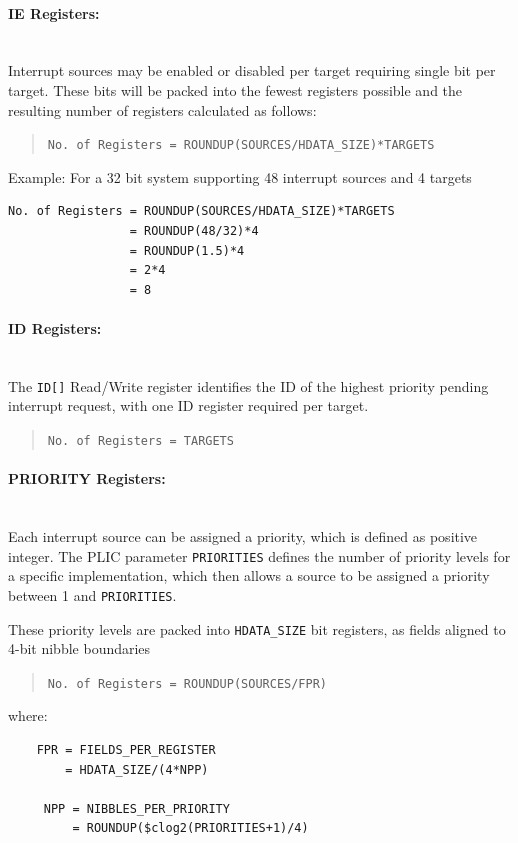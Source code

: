 \paragraph{IE Registers:} ~\\

Interrupt sources may be enabled or disabled per target requiring single
bit per target. These bits will be packed into the fewest registers
possible and the resulting number of registers calculated as follows:

\begin{quote}
\texttt{No.\ of\ Registers\ =\ ROUNDUP(SOURCES/HDATA\_SIZE)*TARGETS}
\end{quote}

Example: For a 32 bit system supporting 48 interrupt sources and 4
targets

\begin{verbatim}
No. of Registers = ROUNDUP(SOURCES/HDATA_SIZE)*TARGETS
                 = ROUNDUP(48/32)*4
                 = ROUNDUP(1.5)*4
                 = 2*4
                 = 8
\end{verbatim}

\paragraph{ID Registers:} ~\\

The \texttt{ID[]} Read/Write
register identifies the ID of the highest priority pending interrupt
request, with one ID register required per target.

\begin{quote}
\texttt{No.\ of\ Registers\ =\ TARGETS}
\end{quote}

\paragraph{PRIORITY Registers:} ~\\

Each interrupt source can be assigned a priority, which is defined as
positive integer. The PLIC parameter \texttt{PRIORITIES} defines the
number of priority levels for a specific implementation, which then
allows a source to be assigned a priority between 1 and
\texttt{PRIORITIES}.

These priority levels are packed into
\texttt{HDATA\_SIZE} bit registers, as fields aligned to
4-bit nibble boundaries

\begin{quote}
\texttt{No.\ of\ Registers\ =\ ROUNDUP(SOURCES/FPR)}
\end{quote}
where:
\indent
\begin{verbatim}
    FPR = FIELDS_PER_REGISTER    
        = HDATA_SIZE/(4*NPP)

     NPP = NIBBLES_PER_PRIORITY
         = ROUNDUP($clog2(PRIORITIES+1)/4)
\end{verbatim}

